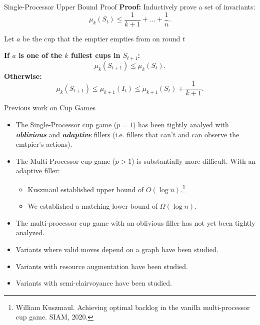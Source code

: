 \documentclass[xcolor=x11names, svgnames, rgb]{beamer}
\newcommand{\defn}[1]       {{\textit{\textbf{\boldmath #1}}}}
\begin{document}
\begin{frame}[t]{Single-Processor Upper Bound Proof}
  \textbf{Proof:}
  Inductively prove a set of invariants: 
    $$\mu_k(S_t) \le \frac{1}{k+1} + \ldots +\frac{1}{n}.$$

  \vspace{0.25cm}
  Let $a$ be the cup that the emptier empties from on round $t$

  \vspace{0.25cm}
  \textbf{If $a$ is one of the $k$ fullest cups in $S_{t+1}$:}
  $$\mu_k(S_{t+1}) \le \mu_k(S_t).$$
  \textbf{Otherwise:}
  $$\mu_k(S_{t+1}) \le \mu_{k+1}(I_t) \le \mu_{k+1}(S_{t}) + \frac{1}{k+1}.$$
\end{frame}

\begin{frame}[t]{Previous work on Cup Games}
  \begin{itemize}
    \item The Single-Processor cup game ($p=1$) has been tightly analyed with
      \defn{oblivious} and \defn{adaptive} fillers (i.e. fillers that can't and
      can observe the emtpier's actions).
    \item The Multi-Processor cup game ($p>1$) is substantially more difficult. With an adaptive filler:
      \begin{itemize}
        \item Kuszmaul established upper bound of $O(\log n)$.\footnote{\tiny\color{blue}William Kuszmaul. Achieving optimal backlog in the vanilla multi-processor cup game. SIAM, 2020.}
        \item We established a matching lower bound of $\Omega(\log n)$.
      \end{itemize}
    \item The multi-processor cup game with an oblivious filler has not yet
      been tightly analyzed.
    \item Variants where valid moves depend on a graph have been studied.
    \item Variants with resource augmentation have been studied.
    \item Variants with semi-clairvoyance have been studied.
  \end{itemize}
\end{frame}
\end{document}

